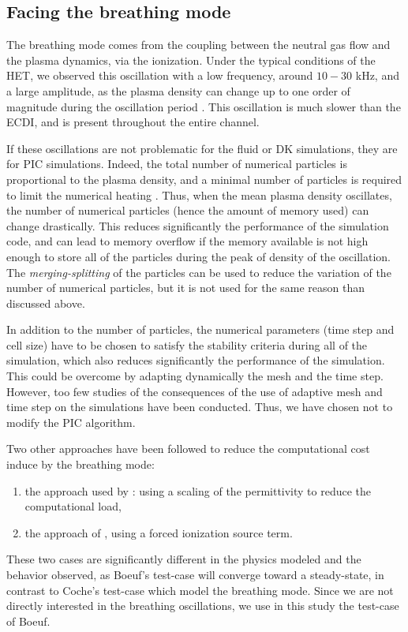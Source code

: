 \subsection{Facing the breathing mode} \label{subsec-breathmod}
The breathing mode comes from the coupling between the neutral gas flow and the plasma dynamics, via the ionization.
Under the typical conditions of the \ac{HET}, we observed this oscillation with a low frequency, around  $10-30$ kHz, and a large amplitude, as the plasma density can change up to one order of magnitude during the oscillation period \citep{barral2003a,barral2009}.
This oscillation is much slower than the \ac{ECDI}, and is present throughout the entire channel.

If these oscillations are not problematic for the fluid or \ac{DK} simulations, they are for \ac{PIC} simulations.
Indeed, the total number of numerical particles is proportional to the plasma density, and a minimal number of particles is required to limit the numerical heating \citep{turner2006}.
Thus, when the mean plasma density oscillates, the number of numerical particles (hence the amount of memory used) can change drastically.
This reduces significantly the performance of the simulation code, and can lead to memory overflow if the memory available is not high enough to store all of the particles during the peak of density  of the oscillation.
The \emph{merging-splitting} of the particles  can be used to reduce the variation of the number of numerical particles, but it is not used for the same reason than discussed above.

In addition to the number of particles, the numerical parameters (time step and cell size) have to be chosen to satisfy the stability criteria during all of the simulation, which also reduces significantly the performance of the simulation. 
This could be overcome by adapting dynamically the mesh and the time step.
However, too few studies of the consequences of the use of adaptive mesh and time step on the simulations have been conducted.
Thus, we have chosen not to modify the \ac{PIC} algorithm.

Two other approaches have been followed to reduce the computational cost induce by the breathing mode\string:
\begin{enumerate}
  \item the approach used by \citet{coche2014}\string: using a scaling of the permittivity to reduce the computational load,
  \item the approach of \citet{boeuf2018}, using a forced ionization source term.
\end{enumerate} 
These two cases are significantly different in the physics modeled and the behavior observed, as Boeuf's test-case will converge toward a steady-state, in contrast to Coche's test-case which model the breathing mode.
Since we are not directly interested in the breathing oscillations, we use in this study the test-case of Boeuf.

